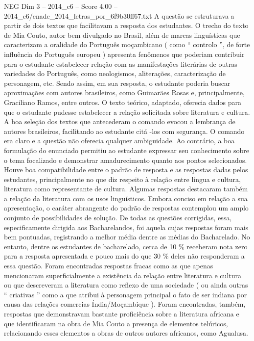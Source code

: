 \begin{textsample}{NEG Dim 3 – 2014\_c6 – Score 4.00 – 2014\_c6/enade\_2014\_letras\_por\_6f9b30ff67.txt}
A questão se estruturava a partir de dois textos que facilitavam a resposta dos estudantes.
O trecho do texto de Mia Couto, autor bem divulgado no Brasil, além de marcas linguísticas que caracterizam a oralidade do Português moçambicano ( como “ controlo ”, de forte influência do Português europeu ) apresenta fenômenos que poderiam contribuir para o estudante estabelecer relação com as manifestações literárias de outras variedades do Português, como neologismos, aliterações, caracterização de personagem, etc.
Sendo assim, em sua resposta, o estudante poderia buscar aproximações com autores brasileiros, como Guimarães Rosas e, principalmente, Graciliano Ramos, entre outros.
O texto teórico, adaptado, oferecia dados para que o estudante pudesse estabelecer a relação solicitada sobre literatura e cultura.
A boa seleção dos textos que antecederam o comando evocou a lembrança de autores brasileiros, facilitando ao estudante citá -los com segurança.
O comando era claro e a questão não oferecia qualquer ambiguidade.
Ao contrário, a boa formulação do enunciado permitiu ao estudante expressar seu conhecimento sobre o tema focalizado e demonstrar amadurecimento quanto aos pontos selecionados.
Houve boa compatibilidade entre o padrão de resposta e as respostas dadas pelos estudantes, principalmente no que diz respeito à relação entre língua e cultura, literatura como representante de cultura.
Algumas respostas destacaram também a relação da literatura com os usos linguísticos.
Embora conciso em relação a sua apresentação, o caráter abrangente do padrão de respostas contemplou um amplo conjunto de possibilidades de solução.
De todas as questões corrigidas, essa, especificamente dirigida aos Bacharelandos, foi aquela cujas respostas foram mais bem pontuadas, registrando a melhor média dentre as médias do Bacharelado.
No entanto, dentre os estudantes de bacharelado, cerca de 10 \% receberam nota zero para a resposta apresentada e pouco mais do que 30 \% deles não responderam a essa questão.
Foram encontradas respostas fracas como as que apenas mencionaram superficialmente a existência da relação entre literatura e cultura ou que descreveram a literatura como reflexo de uma sociedade ( ou ainda outras “ criativas ” como a que atribui à personagem principal o fato de ser indiana por causa das relações comercias Índia/Moçambique ).
Foram encontradas, também, respostas que demonstravam bastante proficiência sobre a literatura africana e que identificaram na obra de Mia Couto a presença de elementos telúricos, relacionando esses elementos a obras de outros autores africanos, como Agualusa.

\end{textsample}
